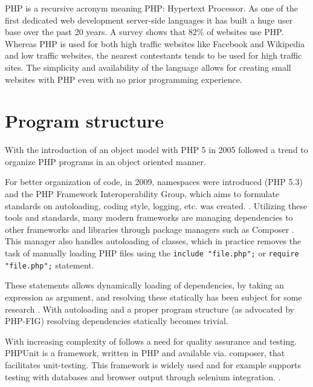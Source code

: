 PHP is a recursive acronym meaning PHP: Hypertext Processor. As one of the first dedicated web development server-side languages it has built a huge user base over the past 20 years. A survey shows that 82\% of websites use PHP. Whereas PHP is used for both high traffic websites like Facebook and Wikipedia and low traffic websites, the nearest contestants tends to be used for high traffic sites. The simplicity and availability of the language allows for creating small websites with PHP even with no prior programming experience. %
\section{Program structure}
With the introduction of an object model with PHP 5 in 2005 followed a trend to organize PHP programs in an object oriented manner. 

For better organization of code, in 2009, namespaces were introduced (PHP 5.3) and the PHP Framework Interoperability Group, which aims to formulate standards on autoloading, coding style, logging, etc. was created. . Utilizing these tools and standards, many modern frameworks are managing dependencies to other frameworks and libraries through package managers such as Composer . This manager also handles autoloading of classes, which in practice removes the task of manually loading PHP files using the \texttt{include "file.php";} or \texttt{require "file.php";} statement. 

These statements allows dynamically loading of dependencies, by taking an expression as argument, and resolving these statically has been subject for some research . With autoloading and a proper program structure (as advocated by PHP-FIG) resolving dependencies statically becomes trivial.

With increasing complexity of follows a need for quality assurance and testing. PHPUnit is a framework, written in PHP and available via. composer, that facilitates unit-testing. This framework is widely used and for example supports testing with databases and browser output through selenium integration. . 




